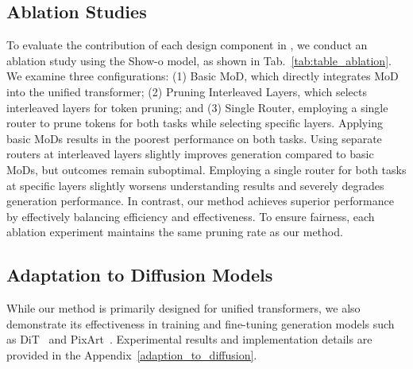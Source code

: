 
\subsection{Ablation Studies}



To evaluate the contribution of each design component in \method{}, we conduct an ablation study using the Show-o model, as shown in Tab.~\ref{tab:table_ablation}. We examine three configurations: (1) Basic MoD, which directly integrates MoD into the unified transformer; (2) Pruning Interleaved Layers, which selects interleaved layers for token pruning; and (3) Single Router, employing a single router to prune tokens for both tasks while selecting specific layers. Applying basic MoDs results in the poorest performance on both tasks. Using separate routers at interleaved layers slightly improves generation compared to basic MoDs, but outcomes remain suboptimal. Employing a single router for both tasks at specific layers slightly worsens understanding results and severely degrades generation performance. In contrast, our method achieves superior performance by effectively balancing efficiency and effectiveness. To ensure fairness, each ablation experiment maintains the same pruning rate as our method.








\subsection{Adaptation to Diffusion Models}

While our method is primarily designed for unified transformers, we also demonstrate its effectiveness in training and fine-tuning generation models such as DiT~\cite{dit} and PixArt~\cite{pixart}. Experimental results and implementation details are provided in the Appendix~\ref{adaption_to_diffusion}.










